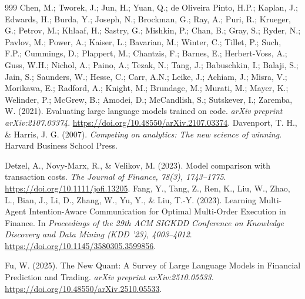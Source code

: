 \documentclass[11pt,a4paper]{article}
\begin{document}
\begin{thebibliography}{999}
 Chen, M.; Tworek, J.; Jun, H.; Yuan, Q.; de Oliveira Pinto, H.P.; Kaplan, J.; Edwards, H.; Burda, Y.; Joseph, N.; Brockman, G.; Ray, A.; Puri, R.; Krueger, G.; Petrov, M.; Khlaaf, H.; Sastry, G.; Mishkin, P.; Chan, B.; Gray, S.; Ryder, N.; Pavlov, M.; Power, A.; Kaiser, L.; Bavarian, M.; Winter, C.; Tillet, P.; Such, F.P.; Cummings, D.; Plappert, M.; Chantzis, F.; Barnes, E.; Herbert-Voss, A.; Guss, W.H.; Nichol, A.; Paino, A.; Tezak, N.; Tang, J.; Babuschkin, I.; Balaji, S.; Jain, S.; Saunders, W.; Hesse, C.; Carr, A.N.; Leike, J.; Achiam, J.; Misra, V.; Morikawa, E.; Radford, A.; Knight, M.; Brundage, M.; Murati, M.; Mayer, K.; Welinder, P.; McGrew, B.; Amodei, D.; McCandlish, S.; Sutskever, I.; Zaremba, W. (2021). Evaluating large language models trained on code. \emph{arXiv preprint arXiv:2107.03374}. \url{https://doi.org/10.48550/arXiv.2107.03374}.
 Davenport, T. H., \& Harris, J. G. (2007). \emph{Competing on analytics: The new science of winning}. Harvard Business School Press.

 Detzel, A., Novy-Marx, R., \& Velikov, M. (2023). Model comparison with transaction costs. \emph{The Journal of Finance, 78(3), 1743--1775}. \url{https://doi.org/10.1111/jofi.13205}.
 Fang, Y., Tang, Z., Ren, K., Liu, W., Zhao, L., Bian, J., Li, D., Zhang, W., Yu, Y., \& Liu, T.-Y. (2023). Learning Multi-Agent Intention-Aware Communication for Optimal Multi-Order Execution in Finance. In \emph{Proceedings of the 29th ACM SIGKDD Conference on Knowledge Discovery and Data Mining (KDD '23), 4003--4012}. \url{https://doi.org/10.1145/3580305.3599856}.

 Fu, W. (2025). The New Quant: A Survey of Large Language Models in Financial Prediction and Trading. \emph{arXiv preprint arXiv:2510.05533}. \url{https://doi.org/10.48550/arXiv.2510.05533}.


\end{thebibliography}
\end{document}
